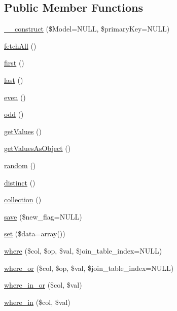 \subsection*{Public Member Functions}
\begin{DoxyCompactItemize}
\item 
\hyperlink{class_linda_model_a390733a9383147df82148a7039976906}{\+\_\+\+\_\+construct} (\$Model=N\+U\+L\+L, \$primary\+Key=N\+U\+L\+L)
\item 
\hyperlink{class_linda_model_af008f367d5ca054454dacc1e8830d7fd}{fetch\+All} ()
\item 
\hyperlink{class_linda_model_ac73eef9ff76ea330c0dab36ca448b90d}{first} ()
\item 
\hyperlink{class_linda_model_ac90cadb327363232bb2d83a4f8ebd613}{last} ()
\item 
\hyperlink{class_linda_model_a046b5f5e8b171d4724f2780303239825}{even} ()
\item 
\hyperlink{class_linda_model_a666c4ea82d473f0e68ad97e3f33d1e83}{odd} ()
\item 
\hyperlink{class_linda_model_a70a0fe08035189260c72e32a9e20d30c}{get\+Values} ()
\item 
\hyperlink{class_linda_model_aa21c070bc4453dc79caa7f30a53ea7a2}{get\+Values\+As\+Object} ()
\item 
\hyperlink{class_linda_model_a357721c0ac543c54de90e0355b7fa8ca}{random} ()
\item 
\hyperlink{class_linda_model_ae4874fb37e48bd82b312d994b357fad8}{distinct} ()
\item 
\hyperlink{class_linda_model_ab24fa179a41ab9c933c32181e3d3ed84}{collection} ()
\item 
\hyperlink{class_linda_model_a637f52fa554aa09e732a30691d68e172}{save} (\$new\+\_\+flag=N\+U\+L\+L)
\item 
\hyperlink{class_linda_model_a6b574d6569f95f11d7b1ba119185ac6d}{set} (\$data=array())
\item 
\hyperlink{class_linda_model_ae3e762679001a1b37d112d30b8b2996c}{where} (\$col, \$op, \$val, \$join\+\_\+table\+\_\+index=N\+U\+L\+L)
\item 
\hyperlink{class_linda_model_a521053bce6277525c2429b30db0b083e}{where\+\_\+or} (\$col, \$op, \$val, \$join\+\_\+table\+\_\+index=N\+U\+L\+L)
\item 
\hyperlink{class_linda_model_af2cd4e8ab564012941e2e5837a64419a}{where\+\_\+in\+\_\+or} (\$col, \$val)
\item 
\hyperlink{class_linda_model_a6978f186be10e963c0bbec845bad0347}{where\+\_\+in} (\$col, \$val)

\end{DoxyCompactItemize}
